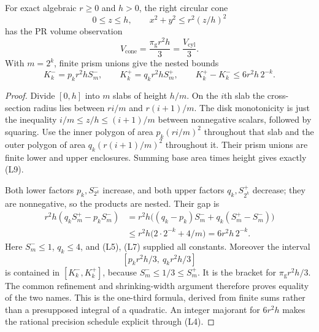 \begin{theorem}
\label{lim:cone}
For exact algebraic $r\ge0$ and $h>0$, the right circular cone
\[
 0\le z\le h,\qquad x^2+y^2\le r^2(z/h)^2
\]
has the PR volume observation
\[
 V_{\mathrm{cone}}=\frac{\pi_{\mathrm g}r^2h}{3}
                  =\frac{V_{\mathrm{cyl}}}{3}.
\]
With $m=2^k$, finite prism unions give the nested bounds
\[
 K_k^-=p_kr^2hS_m^-,\qquad K_k^+=q_kr^2hS_m^+,
 \qquad K_k^+-K_k^-\le6r^2h\,2^{-k}.                 \tag{L9}
\]
\end{theorem}
\begin{proof}
Divide $[0,h]$ into $m$ slabs of height $h/m$.
On the $i$th slab the cross-section radius lies between
$ri/m$ and $r(i+1)/m$. The disk monotonicity is just the inequality
$i/m\le z/h\le(i+1)/m$ between nonnegative scalars, followed by squaring.
Use the inner polygon of area $p_k(ri/m)^2$ throughout that slab and
the outer polygon of area $q_k(r(i+1)/m)^2$ throughout it.
Their prism unions are finite lower and upper enclosures. Summing
base area times height gives exactly (L9).

Both lower factors $p_k,S^-_{2^k}$ increase, and both upper factors
$q_k,S^+_{2^k}$ decrease; they are nonnegative, so the products are
nested. Their gap is
\begin{align*}
 r^2h(q_kS_m^+-p_kS_m^-)
 &=r^2h\bigl((q_k-p_k)S_m^-+q_k(S_m^+-S_m^-)\bigr)\\
 &\le r^2h\bigl(2\cdot2^{-k}+4/m\bigr)
   =6r^2h\,2^{-k}.
\end{align*}
Here $S_m^-\le1$, $q_k\le4$, and (L5), (L7) supplied all constants.
Moreover the interval
\[
 [p_kr^2h/3,\ q_kr^2h/3]
\]
is contained in $[K_k^-,K_k^+]$, because
$S_m^-\le1/3\le S_m^+$. It is the bracket for
$\pi_{\mathrm g}r^2h/3$. The common refinement and shrinking-width
argument therefore proves equality of the two names. This is the
one-third formula, derived from finite sums rather than a presupposed
integral of a quadratic. An integer majorant for $6r^2h$ makes the
rational precision schedule explicit through (L4).
\end{proof}


